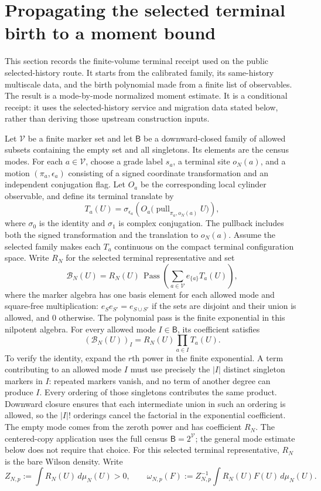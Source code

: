 \section{Propagating the selected terminal birth to a moment bound}\label{ex-selected-birth-receipt}

This section records the finite-volume terminal receipt used on the public selected-history route. It starts from the calibrated family, its same-history multiscale data, and the birth polynomial made from a finite list of observables. The result is a mode-by-mode normalized moment estimate. It is a conditional receipt: it uses the selected-history service and migration data stated below, rather than deriving those upstream construction inputs.

Let $\mathcal V$ be a finite marker set and let $\mathsf B$ be a downward-closed family of allowed subsets containing the empty set and all singletons. Its elements are the census modes. For each $a\in\mathcal V$, choose a grade label $s_a$, a terminal site $o_N(a)$, and a motion $(\pi_a,\epsilon_a)$ consisting of a signed coordinate transformation and an independent conjugation flag. Let $O_a$ be the corresponding local cylinder observable, and define its terminal translate by
\[
 T_a(U)=\sigma_{\epsilon_a}\!\left(O_a\bigl(\operatorname{pull}_{\pi_a,o_N(a)}U\bigr)\right),
\]
where $\sigma_0$ is the identity and $\sigma_1$ is complex conjugation. The pullback includes both the signed transformation and the translation to $o_N(a)$.
Assume the selected family makes each $T_a$ continuous on the compact terminal configuration space. Write $R_N$ for the selected terminal representative and set
\[
 \mathcal B_N(U)=R_N(U)\,\operatorname{Pass}\!\left(
    \sum_{a\in\mathcal V} e_{\{a\}}T_a(U)\right),
\]
where the marker algebra has one basis element for each allowed mode and square-free multiplication: $e_S e_{S'}=e_{S\cup S'}$ if the sets are disjoint and their union is allowed, and $0$ otherwise. The polynomial pass is the finite exponential in this nilpotent algebra. For every allowed mode $I\in\mathsf B$, its coefficient satisfies
\[
 (\mathcal B_N(U))_I=R_N(U)\prod_{a\in I}T_a(U).
\]
To verify the identity, expand the $r$th power in the finite exponential. A term contributing to an allowed mode $I$ must use precisely the $|I|$ distinct singleton markers in $I$: repeated markers vanish, and no term of another degree can produce $I$. Every ordering of those singletons contributes the same product. Downward closure ensures that each intermediate union in such an ordering is allowed, so the $|I|!$ orderings cancel the factorial in the exponential coefficient. The empty mode comes from the zeroth power and has coefficient $R_N$. The centered-copy application uses the full census $\mathsf B=2^{\mathcal V}$; the general mode estimate below does not require that choice.
For this selected terminal representative, $R_N$ is the bare Wilson density. Write
\[
 Z_{N,p}:=\int R_N(U)\,d\mu_N(U)>0,
 \qquad
 \omega_{N,p}(F):=Z_{N,p}^{-1}\int R_N(U)F(U)\,d\mu_N(U).
\]

